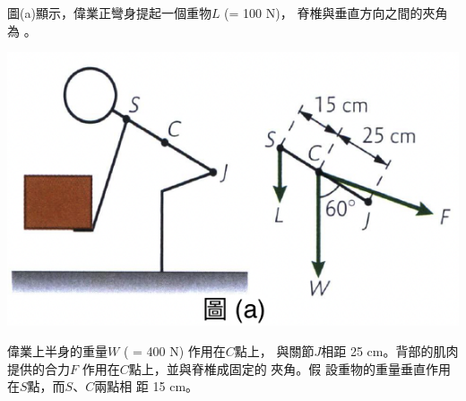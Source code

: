 {
    圖(a)顯示，偉業正彎身提起一個重物$L$ (= 100 N)， 脊椎與垂直方向之間的夾角為 。
    \par{\par\centering\includegraphics[width=.4\textwidth]{./img/ch3_moment_lq_2024-05-11-20-03-15.png}\par}
    偉業上半身的重量$W$ ( = 400 N) 作用在$C$點上， 與關節$J$相距 25 cm。背部的肌肉提供的合力$F$ 作用在$C$點上，並與脊椎成固定的  夾角。假 設重物的重量垂直作用在$S$點，而$S$、$C$兩點相 距 15 cm。
    }
